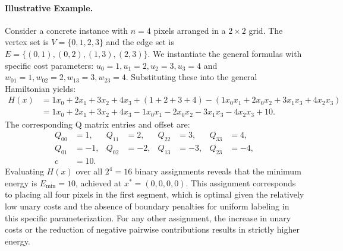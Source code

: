 \documentclass[12pt]{article}
\begin{document}
\paragraph{Illustrative Example.}
Consider a concrete instance with $n = 4$ pixels arranged in a $2 \times 2$ grid. The vertex set is $V = \{0, 1, 2, 3\}$ and the edge set is $E = \{(0,1), (0,2), (1,3), (2,3)\}$. We instantiate the general formulas with specific cost parameters: $u_0 = 1, u_1 = 2, u_2 = 3, u_3 = 4$ and $w_{01} = 1, w_{02} = 2, w_{13} = 3, w_{23} = 4$. Substituting these into the general Hamiltonian yields:
\begin{align}
    H(x) &= 1x_0 + 2x_1 + 3x_2 + 4x_3 + (1+2+3+4) - (1x_0x_1 + 2x_0x_2 + 3x_1x_3 + 4x_2x_3) \\
         &= 1x_0 + 2x_1 + 3x_2 + 4x_3 - 1x_0x_1 - 2x_0x_2 - 3x_1x_3 - 4x_2x_3 + 10.
\end{align}
The corresponding Q matrix entries and offset are:
\begin{align}
    Q_{00} &= 1, & Q_{11} &= 2, & Q_{22} &= 3, & Q_{33} &= 4, \\
    Q_{01} &= -1, & Q_{02} &= -2, & Q_{13} &= -3, & Q_{23} &= -4, \\
    c &= 10.
\end{align}
Evaluating $H(x)$ over all $2^4 = 16$ binary assignments reveals that the minimum energy is $E_{\min} = 10$, achieved at $x^* = (0, 0, 0, 0)$. This assignment corresponds to placing all four pixels in the first segment, which is optimal given the relatively low unary costs and the absence of boundary penalties for uniform labeling in this specific parameterization. For any other assignment, the increase in unary costs or the reduction of negative pairwise contributions results in strictly higher energy.
\end{document}

